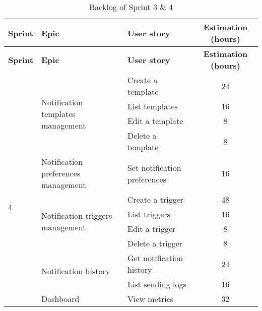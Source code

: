 \begin{longtable}{ | m{}  | m{} | m{} | c | }
    \caption{Backlog of Sprint 3 \& 4}                                                                                                          \\
    \hline
    \textbf{Sprint}         & \textbf{Epic}                                        & \textbf{User story}          & \textbf{Estimation (hours)} \\
    \hline
    \endfirsthead
    \hline
    \textbf{Sprint}         & \textbf{Epic}                                        & \textbf{User story}          & \textbf{Estimation (hours)} \\
    \hline
    \endhead
    \hline
    \endfoot
    \endlastfoot
    \multirow[t]{2}{5em}{3} & \multirow{4}{5em}{Notification templates management} & Create a template            & 24                          \\
    \cline{3-4}
                            &                                                      & List templates               & 16                          \\
    \cline{3-4}
                            &                                                      & Edit a template              & 8                           \\
    \cline{3-4}
                            &                                                      & Delete a template            & 8                           \\
                            & Notification preferences management                  & Set notification preferences & 16                          \\
    \hline
    \multirow[t]{2}{5em}{4} & \multirow{4}{5em}{Notification triggers management}  & Create a trigger             & 48                          \\
    \cline{3-4}
                            &                                                      & List triggers                & 16                          \\
    \cline{3-4}
                            &                                                      & Edit a trigger               & 8                           \\
    \cline{3-4}
                            &                                                      & Delete a trigger             & 8                           \\
    \cline{2-4}
                            & \multirow{2}{5em}{Notification history}              & Get notification history     & 24                          \\
    \cline{3-4}
                            &                                                      & List sending logs            & 16                          \\
    \cline{2-4}
                            & Dashboard                                            & View metrics                 & 32                          \\
    \hline
\end{longtable}

